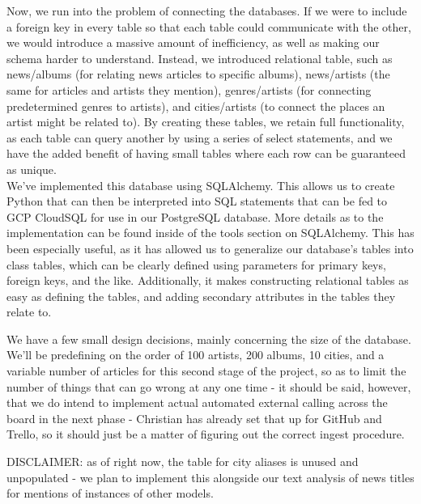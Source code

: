 \documentclass{scrartcl}
\begin{document}
    Now, we run into the problem of connecting the databases.
    If we were to include a foreign key in every table so that each table could communicate with the other, we would introduce a massive amount of inefficiency, as well as making our schema harder to understand.
    Instead, we introduced relational table, such as news/albums (for relating news articles to specific albums), news/artists (the same for articles and artists they mention), genres/artists (for connecting predetermined genres to artists), and cities/artists (to connect the places an artist might be related to).
    By creating these tables, we retain full functionality, as each table can query another by using a series of select statements, and we have the added benefit of having small tables where each row can be guaranteed as unique.\\

    We've implemented this database using SQLAlchemy.
    This allows us to create Python that can then be interpreted into SQL statements that can be fed to GCP CloudSQL for use in our PostgreSQL database.
    More details as to the implementation can be found inside of the tools section on SQLAlchemy.
    This has been especially useful, as it has allowed us to generalize our database's tables into class tables, which can be clearly defined using parameters for primary keys, foreign keys, and the like.
    Additionally, it makes constructing relational tables as easy as defining the tables, and adding secondary attributes in the tables they relate to.

    We have a few small design decisions, mainly concerning the size of the database.
    We'll be predefining on the order of 100 artists, 200 albums, 10 cities, and a variable number of articles for this second stage of the project, so as to limit the number of things that can go wrong at any one time - it should be said, however, that we do intend to implement actual automated external calling across the board in the next phase - Christian has already set that up for GitHub and Trello, so it should just be a matter of figuring out the correct ingest procedure.

    DISCLAIMER: as of right now, the table for city aliases is unused and unpopulated - we plan to implement this alongside our text analysis of news titles for mentions of instances of other models.

    \newpage
\end{document}
